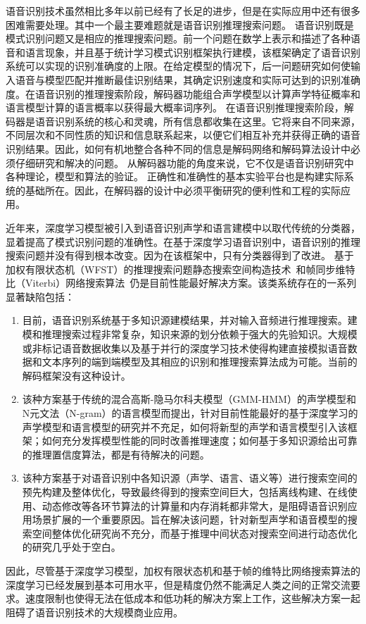 语音识别技术虽然相比多年以前已经有了长足的进步，但是在实际应用中还有很多困难需要处理。其中一个最主要难题就是语音识别推理搜索问题。
%
语音识别既是模式识别问题又是相应的推理搜索问题。前一个问题在数学上表示和描述了各种语音和语言现象，并且基于统计学习模式识别框架执行建模，该框架确定了语音识别系统可以实现的识别准确度的上限。在给定模型的情况下，后一问题研究如何使输入语音与模型匹配并推断最佳识别结果，其确定识别速度和实际可达到的识别准确度。在语音识别的推理搜索阶段，解码器功能组合声学模型以计算声学特征概率和语言模型计算的语言概率以获得最大概率词序列。
在语音识别推理搜索阶段，解码器是语音识别系统的核心和灵魂，所有信息都收集在这里。它将来自不同来源，不同层次和不同性质的知识和信息联系起来，以便它们相互补充并获得正确的语音识别结果。因此，如何有机地整合各种不同的信息是解码网络和解码算法设计中必须仔细研究和解决的问题。
从解码器功能的角度来说，它不仅是语音识别研究中各种理论，模型和算法的验证。
正确性和准确性的基本实验平台也是构建实际系统的基础所在。因此，在解码器的设计中必须平衡研究的便利性和工程的实际应用。


近年来，深度学习模型被引入到语音识别声学和语言建模中以取代传统的分类器，显着提高了模式识别问题的准确性。在基于深度学习语音识别中，语音识别的推理搜索问题并没有得到根本改变。因为在该框架中，只有分类器得到了改进。
基于加权有限状态机（WFST）的推理搜索问题静态搜索空间构造技术~\cite{mohri2002weighted}和帧同步维特比（Viterbi）网络搜索算法~\cite{forney1973viterbi}仍是目前性能最好解决方案。该类系统存在的一系列显著缺陷包括：
\begin{enumerate}
\item 目前，语音识别系统基于多知识源建模结果，并对输入音频进行推理搜索。建模和推理搜索过程非常复杂，知识来源的划分依赖于强大的先验知识。大规模或非标记语音数据收集以及基于并行的深度学习技术使得构建直接模拟语音数据和文本序列的端到端模型及其相应的识别和推理搜索算法成为可能。当前的解码框架没有这种设计。
\item 
该种方案基于传统的混合高斯-隐马尔科夫模型（GMM-HMM）的声学模型和N元文法（N-gram）的语言模型而提出，针对目前性能最好的基于深度学习的声学模型和语言模型的研究并不充足，如何将新型的声学和语言模型引入该框架；如何充分发挥模型性能的同时改善推理速度；如何基于多知识源给出可靠的推理置信度算法，都是有待解决的问题。
\item 
该种方案基于对语音识别中各知识源（声学、语言、语义等）进行搜索空间的预先构建及整体优化，导致最终得到的搜索空间巨大，包括离线构建、在线使用、动态修改等各环节算法的计算量和内存消耗都非常大，是阻碍语音识别应用场景扩展的一个重要原因。旨在解决该问题，针对新型声学和语音模型的搜索空间整体优化研究尚不充分，而基于推理中间状态对搜索空间进行动态优化的研究几乎处于空白。
\end{enumerate}
因此，尽管基于深度学习模型，加权有限状态机和基于帧的维特比网络搜索算法的深度学习已经发展到基本可用水平，但是精度仍然不能满足人类之间的正常交流要求。速度限制也使得无法在低成本和低功耗的解决方案上工作，这些解决方案一起阻碍了语音识别技术的大规模商业应用。

